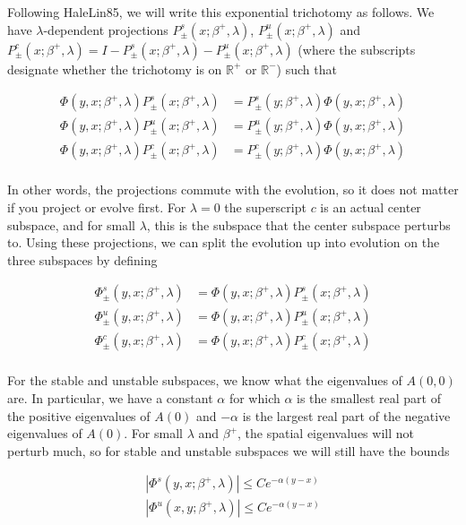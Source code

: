 \documentclass[12pt]{article}
\def\R{{\mathbb R}}
\begin{document}
Following HaleLin85, we will write this exponential trichotomy as follows. We have $\lambda$-dependent projections $P^s_\pm(x; \beta^+, \lambda)$, $P^u_\pm(x; \beta^+, \lambda)$ and $P^c_\pm(x; \beta^+, \lambda) = I - P^s_\pm(x; \beta^+, \lambda) - P^u_\pm(x; \beta^+, \lambda)$ (where the subscripts designate whether the trichotomy is on $\R^+$ or $\R^-$) such that

\begin{align*}
\Phi(y, x; \beta^+, \lambda)P^s_\pm(x; \beta^+, \lambda) &= P^s_\pm(y; \beta^+, \lambda)\Phi(y, x; \beta^+, \lambda) \\
\Phi(y, x; \beta^+, \lambda)P^u_\pm(x; \beta^+, \lambda) &= P^u_\pm(y; \beta^+, \lambda)\Phi(y, x; \beta^+, \lambda) \\
\Phi(y, x; \beta^+, \lambda)P^c_\pm(x; \beta^+, \lambda) &= P^c_\pm(y; \beta^+, \lambda)\Phi(y, x; \beta^+, \lambda) \\
\end{align*}

In other words, the projections commute with the evolution, so it does not matter if you project or evolve first. For $\lambda = 0$ the superscript $c$ is an actual center subspace, and for small $\lambda$, this is the subspace that the center subspace perturbs to. Using these projections, we can split the evolution up into evolution on the three subspaces by defining

\begin{align*}
\Phi^s_\pm(y, x; \beta^+, \lambda) &= \Phi(y, x; \beta^+, \lambda)P^s_\pm(x; \beta^+, \lambda) \\
\Phi^u_\pm(y, x; \beta^+, \lambda) &= \Phi(y, x; \beta^+, \lambda)P^u_\pm(x; \beta^+, \lambda) \\
\Phi^c_\pm(y, x; \beta^+, \lambda) &= \Phi(y, x; \beta^+, \lambda)P^c_\pm(x; \beta^+, \lambda) \\
\end{align*}

For the stable and unstable subspaces, we know what the eigenvalues of $A(0, 0)$ are. In particular, we have a constant $\alpha$ for which $\alpha$ is the smallest real part of the positive eigenvalues of $A(0)$ and $-\alpha$ is the largest real part of the negative eigenvalues of $A(0)$. For small $\lambda$ and $\beta^+$, the spatial eigenvalues will not perturb much, so for stable and unstable subspaces we will still have the bounds

\begin{align*}
|\Phi^s(y, x; \beta^+, \lambda)| \leq C e^{-\alpha(y-x)} \\
|\Phi^u(x, y; \beta^+, \lambda)| \leq C e^{-\alpha(y-x)}
\end{align*}
\end{document}
